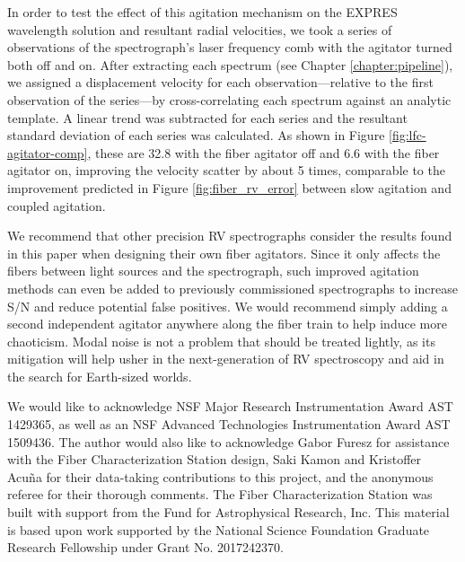 In order to test the effect of this agitation mechanism on the EXPRES wavelength solution and resultant radial velocities, we took a series of observations of the spectrograph's laser frequency comb with the agitator turned both off and on. After extracting each spectrum (see Chapter \ref{chapter:pipeline}), we assigned a displacement velocity for each observation---relative to the first observation of the series---by cross-correlating each spectrum against an analytic template. A linear trend \citep[caused by slow instrumental drifts, see Chapter \ref{wavelength-calibration} and][]{blackman_performance_2020} was subtracted for each series and the resultant standard deviation of each series was calculated. As shown in Figure \ref{fig:lfc-agitator-comp}, these are 32.8 \cms with the fiber agitator off and 6.6 \cms with the fiber agitator on, improving the velocity scatter by about 5 times, comparable to the improvement predicted in Figure \ref{fig:fiber_rv_error} between slow agitation and coupled agitation.

We recommend that other precision RV spectrographs consider the results found in this paper when designing their own fiber agitators. Since it only affects the fibers between light sources and the spectrograph, such improved agitation methods can even be added to previously commissioned spectrographs to increase S/N and reduce potential false positives. We would recommend simply adding a second independent agitator anywhere along the fiber train to help induce more chaoticism. Modal noise is not a problem that should be treated lightly, as its mitigation will help usher in the next-generation of RV spectroscopy and aid in the search for Earth-sized worlds.

\acknowledgments

We would like to acknowledge NSF Major Research Instrumentation Award AST 1429365, as well as an NSF Advanced Technologies Instrumentation Award AST 1509436. The author would also like to acknowledge Gabor Furesz for assistance with the Fiber Characterization Station design, Saki Kamon and Kristoffer Acu\~na for their data-taking contributions to this project, and the anonymous referee for their thorough comments. The Fiber Characterization Station was built with support from the Fund for Astrophysical Research, Inc. This material is based upon work supported by the National Science Foundation Graduate Research Fellowship under Grant No. 2017242370.
